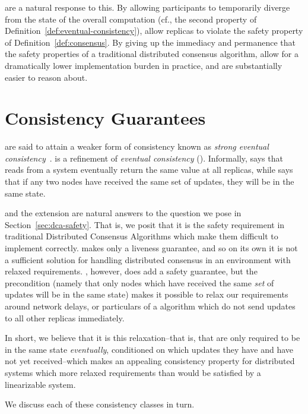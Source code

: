 \CRDTs are a natural response to this. By allowing participants to temporarily
diverge from the state of the overall computation (cf., the second property of
Definition~\ref{def:eventual-consistency}), \CRDTs allow replicas to violate the
safety property of Definition~\ref{def:consensus}.  By giving up the immediacy
and permanence that the safety properties of a traditional distributed consensus
algorithm, \CRDTs allow for a dramatically lower implementation burden in
practice, and are substantially easier to reason about.

\section{Consistency Guarantees}
\CRDTs are said to attain a weaker form of consistency known as \emph{strong
eventual consistency}~\citep{shapiro11}. \SEC is a refinement of \emph{eventual
consistency} (\EC). Informally, \EC says that reads from a system eventually
return the same value at all replicas, while \SEC says that if any two nodes
have received the same set of updates, they will be in the same state.

\EC and the \SEC extension are natural answers to the question we pose in
Section~\ref{sec:dca-safety}. That is, we posit that it is the safety
requirement in traditional Distributed Consensus Algorithms which make them
difficult to implement correctly. \EC makes only a liveness guarantee, and so on
its own it is not a sufficient solution for handling distributed consensus in an
environment with relaxed requirements. \SEC, however, does add a safety
guarantee, but the precondition (namely that only nodes which have received the
same \emph{set} of updates will be in the same state) makes it possible to relax
our requirements around network delays, or particulars of a \CRDT algorithm
which do not send updates to all other replicas immediately.

In short, we believe that it is this relaxation--that is, that \CRDTs are only
required to be in the same state \emph{eventually}, conditioned on which updates
they have and have not yet received--which makes \SEC an appealing consistency
property for distributed systems which more relaxed requirements than would be
satisfied by a linearizable system.

We discuss each of these consistency classes in turn.

